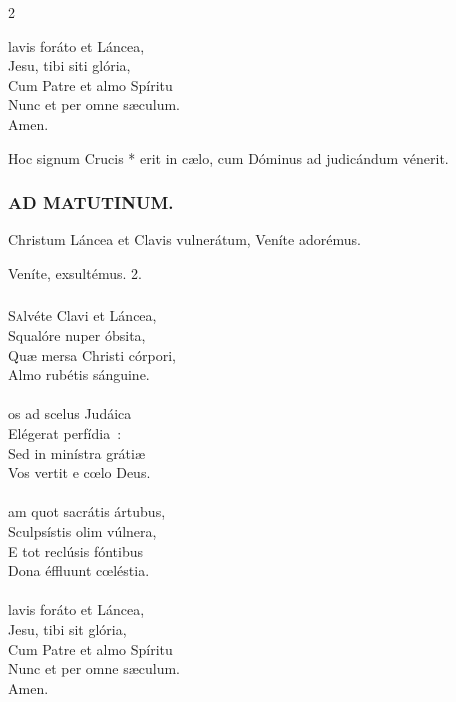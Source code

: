 \documentclass[9pt,twoside]{extarticle}
\begin{document}
\begin{multicols}{2}
\begin{tightlist}{}
\item {}
\item {}lavis foráto et Láncea,\\
Jesu, tibi siti glória,\\
Cum Patre et almo Spíritu\\
Nunc et per omne sæculum.\\
Amen.
\item {} Hoc signum Crucis * erit in cælo, cum Dóminus ad judicándum vénerit.
\end{tightlist}

\subsubsection*{\center \textsc{AD MATUTINUM.}}
\begin{tightlist}{}
\item {} Christum Láncea et Clavis vulnerátum, \textred{*} Veníte adorémus.
\item {} Veníte, exsultémus. 2.
\end{tightlist}

\subsubsection*{\center {}}
\lettrine{S}alvéte Clavi et Láncea,\\
Squalóre nuper óbsita,\\
Quæ mersa Christi córpori,\\
Almo rubétis sánguine.\\
\\
os ad scelus Judáica\\
Elégerat perfídia~:\\
Sed in minístra grátiæ\\
Vos vertit e cœlo Deus.\\
\\
am quot sacrátis ártubus,\\
Sculpsístis olim vúlnera,\\
E tot reclúsis fóntibus\\
Dona éffluunt cœléstia.\\
\\
lavis foráto et Láncea,\\
Jesu, tibi sit glória,\\
Cum Patre et almo Spíritu\\
Nunc et per omne sæculum.\\
Amen.


\end{multicols}
\end{document}
